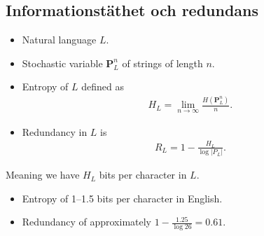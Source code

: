 \documentclass{beamer}
\let\stoch\mathbf{}
\begin{document}
\subsection{Informationstäthet och redundans}

\begin{frame}
  \begin{definition}
    \begin{itemize}
      \item Natural language \(L\).
      \item Stochastic variable \(\stoch P^n_L\) of strings of length \(n\).
      \item Entropy of \(L\) defined as
        \begin{align*}
          H_L = \lim_{n\to \infty}\frac{H(\stoch P^n_L)}{n}.
        \end{align*}
      \item Redundancy in \(L\) is
        \begin{align*}
          R_L = 1 - \frac{H_L}{\log |P_L|}.
        \end{align*}
    \end{itemize}
  \end{definition}
\end{frame}

\begin{frame}
  \begin{remark}
    Meaning we have \(H_L\) bits per character in \(L\).
  \end{remark}

  \begin{example}
    \begin{itemize}
      \item Entropy of 1--1.5 bits per character in English.
      \item Redundancy of approximately \(1 - \frac{1.25}{\log 26} = 0.61\).
    \end{itemize}
  \end{example}

\end{frame}
\end{document}
